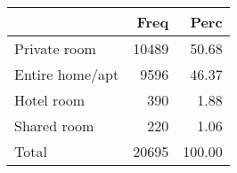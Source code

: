 
\begin{tabular}[t]{lrr}
\toprule
  & Freq & Perc\\
\midrule
Private room & 10489 & 50.68\\
Entire home/apt & 9596 & 46.37\\
Hotel room & 390 & 1.88\\
Shared room & 220 & 1.06\\
Total & 20695 & 100.00\\
\bottomrule
\end{tabular}